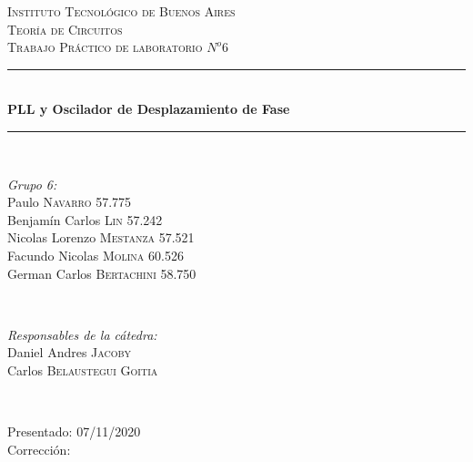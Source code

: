 \begin{titlepage}
\newcommand{\HRule}{\rule{\linewidth}{0.5mm}}
\center
\textsc{\LARGE Instituto Tecnológico de Buenos Aires}\\[1.5cm]
\textsc{\Large Teoría de Circuitos}\\[0.5cm]
\textsc{\large Trabajo Práctico de laboratorio $N^o6$}\\[0.5cm]

\HRule \\[0.4cm]
{ \huge \bfseries PLL y Oscilador de Desplazamiento de Fase}\\[0.1cm] %
\HRule \\[1.5cm]

\begin{minipage}{0.4\textwidth}
\begin{flushleft} \large
\emph{Grupo 6:}\\
Paulo \textsc{Navarro} 57.775\\
Benjamín Carlos \textsc{Lin} 57.242\\
Nicolas Lorenzo  \textsc{Mestanza} 57.521\\
Facundo Nicolas \textsc{Molina} 60.526\\
German Carlos  \textsc{Bertachini} 58.750\\
\end{flushleft}
\end{minipage}
~
\begin{minipage}{0.4\textwidth}
\begin{flushright} \large
\emph{Responsables de la cátedra:} \\
Daniel Andres \textsc{Jacoby}\\
Carlos \textsc{Belaustegui Goitia}\\

\end{flushright}
\end{minipage}\\[4cm]

\begin{minipage}{0.4\textwidth}
\begin{flushleft} \large
Presentado: 07/11/2020\\
Corrección:\\
\end{flushleft}
\end{minipage}
\vfill %

\end{titlepage}
